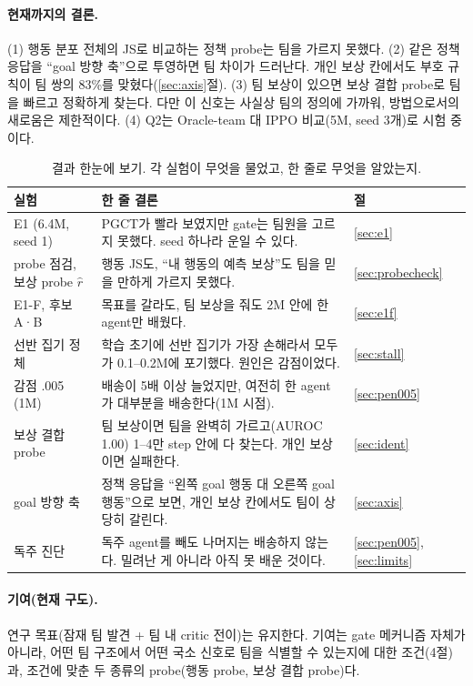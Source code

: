 \documentclass[10pt]{article}
\begin{document}
\paragraph{현재까지의 결론.}
(1) 행동 분포 전체의 JS로 비교하는 정책 probe는 팀을 가르지 못했다.
(2) 같은 정책 응답을 ``goal 방향 축''으로 투영하면 팀 차이가 드러난다. 개인 보상 칸에서도 부호 규칙이 팀 쌍의 83\%를 맞혔다(\ref{sec:axis}절).
(3) 팀 보상이 있으면 보상 결합 probe로 팀을 빠르고 정확하게 찾는다. 다만 이 신호는 사실상 팀의 정의에 가까워, 방법으로서의 새로움은 제한적이다.
(4) Q2는 Oracle-team 대 IPPO 비교(5M, seed 3개)로 시험 중이다.

\begin{table}[h]
\centering
\caption{결과 한눈에 보기. 각 실험이 무엇을 물었고, 한 줄로 무엇을 알았는지.}
\label{tab:glance}
\begin{tabularx}{\textwidth}{>{\raggedright\arraybackslash}p{3.4cm} L >{\raggedright\arraybackslash}p{1.4cm}}
\toprule
실험 & 한 줄 결론 & 절 \\
\midrule
E1 (6.4M, seed 1) & PGCT가 빨라 보였지만 gate는 팀원을 고르지 못했다. seed 하나라 운일 수 있다. & \ref{sec:e1} \\
probe 점검, 보상 probe $\hat r$ & 행동 JS도, ``내 행동의 예측 보상''도 팀을 믿을 만하게 가르지 못했다. & \ref{sec:probecheck} \\
E1-F, 후보 A·B & 목표를 갈라도, 팀 보상을 줘도 2M 안에 한 agent만 배웠다. & \ref{sec:e1f} \\
선반 집기 정체 & 학습 초기에 선반 집기가 가장 손해라서 모두가 0.1--0.2M에 포기했다. 원인은 감점이었다. & \ref{sec:stall} \\
감점 .005 (1M) & 배송이 5배 이상 늘었지만, 여전히 한 agent가 대부분을 배송한다(1M 시점). & \ref{sec:pen005} \\
보상 결합 probe & 팀 보상이면 팀을 완벽히 가르고(AUROC 1.00) 1--4만 step 안에 다 찾는다. 개인 보상이면 실패한다. & \ref{sec:ident} \\
goal 방향 축 & 정책 응답을 ``왼쪽 goal 행동 대 오른쪽 goal 행동''으로 보면, 개인 보상 칸에서도 팀이 상당히 갈린다. & \ref{sec:axis} \\
독주 진단 & 독주 agent를 빼도 나머지는 배송하지 않는다. 밀려난 게 아니라 아직 못 배운 것이다. & \ref{sec:pen005}, \ref{sec:limits} \\
\bottomrule
\end{tabularx}
\end{table}

\paragraph{기여(현재 구도).}
연구 목표(잠재 팀 발견 + 팀 내 critic 전이)는 유지한다.
기여는 gate 메커니즘 자체가 아니라, 어떤 팀 구조에서 어떤 국소 신호로 팀을 식별할 수 있는지에 대한 조건(4절)과, 조건에 맞춘 두 종류의 probe(행동 probe, 보상 결합 probe)다.
\end{document}
